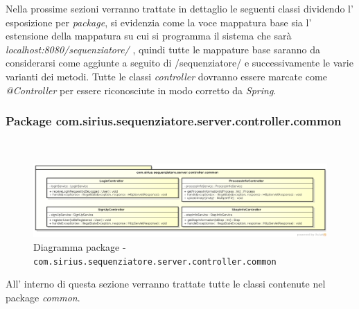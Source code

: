 Nella prossime sezioni verranno trattate in dettaglio le seguenti classi dividendo l' esposizione per \textit{package}, si evidenzia come la voce mappatura base sia l' estensione della mappatura su cui si programma il sistema che sarà \textit{localhost:8080/sequenziatore/} , quindi tutte le mappature base saranno da considerarsi come aggiunte a seguito di /sequenziatore/ e successivamente le varie varianti dei metodi.
Tutte le classi \textit{controller} dovranno essere marcate come \textit{@Controller} per essere riconosciute in modo corretto da \textit{Spring}.
\subsubsection{Package com.sirius.sequenziatore.server.controller.common}
\
\begin{figure}[H] \centering \includegraphics[width=%
\textwidth]
{./classi/server/controllercommon.png} \caption{Diagramma package - \texttt{com.sirius.sequenziatore.server.controller.common}}
\end{figure}
All' interno di questa sezione verranno trattate tutte le classi contenute nel package \textit{common}.
